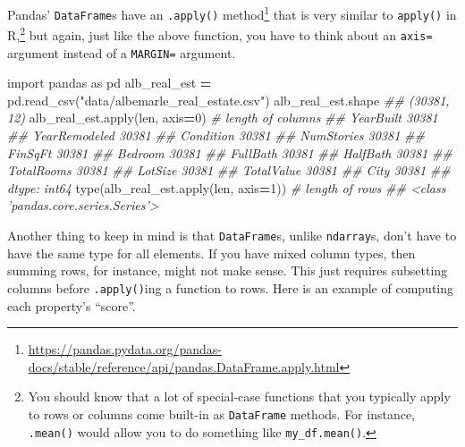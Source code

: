 \documentclass[12pt,krantz2]{krantz}
\makeatletter
\newenvironment{Shaded}{\begin{snugshade}}{\end{snugshade}}
\newcommand{\BuiltInTok}[1]{#1}
\newcommand{\CommentTok}[1]{\textcolor[rgb]{0.37,0.37,0.37}{\textit{#1}}}
\newcommand{\DecValTok}[1]{\textcolor[rgb]{0.06,0.06,0.06}{#1}}
\newcommand{\ImportTok}[1]{#1}
\newcommand{\NormalTok}[1]{#1}
\newcommand{\OperatorTok}[1]{\textcolor[rgb]{0.43,0.43,0.43}{\textbf{#1}}}
\newcommand{\StringTok}[1]{\textcolor[rgb]{0.5,0.5,0.5}{#1}}
\renewcommand{\href}[2]{#2\footnote{\url{#1}}}
\newenvironment{kframe}{%
\medskip{}
\setlength{\fboxsep}{.8em}
 \def\at@end@of@kframe{}%
 \ifinner\ifhmode%
  \def\at@end@of@kframe{\end{minipage}}%
  \begin{minipage}{\columnwidth}%
 \fi\fi%
 \def\FrameCommand##1{\hskip\@totalleftmargin \hskip-\fboxsep
 \colorbox{shadecolor}{##1}\hskip-\fboxsep
     \hskip-\linewidth \hskip-\@totalleftmargin \hskip\columnwidth}%
 \MakeFramed {\advance\hsize-\width
   \@totalleftmargin\z@ \linewidth\hsize
   \@setminipage}}%
 {\par\unskip\endMakeFramed%
 \at@end@of@kframe}
\renewenvironment{Shaded}{\begin{kframe}}{\end{kframe}}
\makeatother
\begin{document}
Pandas' \texttt{DataFrame}s have an \href{https://pandas.pydata.org/pandas-docs/stable/reference/api/pandas.DataFrame.apply.html}{\texttt{.apply()} method} that is very similar to \texttt{apply()} in R,\footnote{You should know that a lot of special-case functions that you typically apply to rows or columns come built-in as \texttt{DataFrame} methods. For instance, \texttt{.mean()} would allow you to do something like \texttt{my\_df.mean()}.} but again, just like the above function, you have to think about an \texttt{axis=} argument instead of a \texttt{MARGIN=} argument.

\begin{Shaded}
\begin{Highlighting}[]
\ImportTok{import}\NormalTok{ pandas }\ImportTok{as}\NormalTok{ pd}
\NormalTok{alb_real_est }\OperatorTok{=}\NormalTok{ pd.read_csv(}\StringTok{"data/albemarle_real_estate.csv"}\NormalTok{)}
\NormalTok{alb_real_est.shape}
\CommentTok{## (30381, 12)}
\NormalTok{alb_real_est.}\BuiltInTok{apply}\NormalTok{(}\BuiltInTok{len}\NormalTok{, axis}\OperatorTok{=}\DecValTok{0}\NormalTok{) }\CommentTok{# length of columns}
\CommentTok{## YearBuilt        30381}
\CommentTok{## YearRemodeled    30381}
\CommentTok{## Condition        30381}
\CommentTok{## NumStories       30381}
\CommentTok{## FinSqFt          30381}
\CommentTok{## Bedroom          30381}
\CommentTok{## FullBath         30381}
\CommentTok{## HalfBath         30381}
\CommentTok{## TotalRooms       30381}
\CommentTok{## LotSize          30381}
\CommentTok{## TotalValue       30381}
\CommentTok{## City             30381}
\CommentTok{## dtype: int64}
\BuiltInTok{type}\NormalTok{(alb_real_est.}\BuiltInTok{apply}\NormalTok{(}\BuiltInTok{len}\NormalTok{, axis}\OperatorTok{=}\DecValTok{1}\NormalTok{)) }\CommentTok{# length of rows}
\CommentTok{## <class 'pandas.core.series.Series'>}
\end{Highlighting}
\end{Shaded}

Another thing to keep in mind is that \texttt{DataFrame}s, unlike \texttt{ndarray}s, don't have to have the same type for all elements. If you have mixed column types, then summing rows, for instance, might not make sense. This just requires subsetting columns before \texttt{.apply()}ing a function to rows. Here is an example of computing each property's ``score''.
\end{document}
